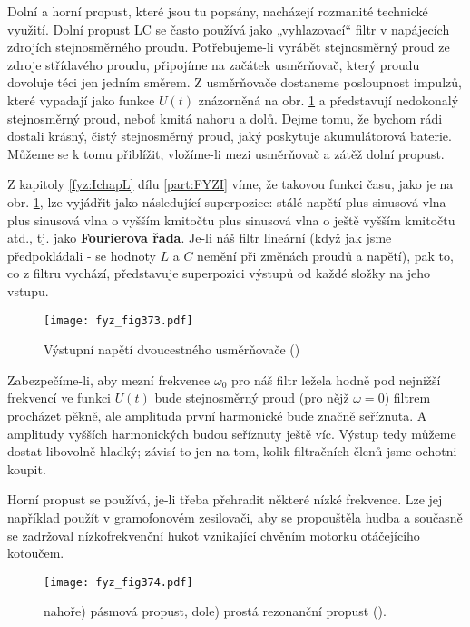   Dolní a horní propust, které jsou tu popsány, nacházejí rozmanité technické využití. Dolní 
  propust LC se často používá jako „vyhlazovací“ filtr v napájecích zdrojích stejnosměrného proudu. 
  Potřebujeme-li vyrábět stejnosměrný proud ze zdroje střídavého proudu, připojíme na začátek 
  usměrňovač, který proudu dovoluje téci jen jedním směrem. Z usměrňovače dostaneme posloupnost 
  impulzů, které vypadají jako funkce \(U(t)\) znázorněná na obr. \ref{fyz:fig373} a představují 
  nedokonalý stejnosměrný proud, neboť kmitá nahoru a dolů. Dejme tomu, že bychom rádi dostali 
  krásný, čistý stejnosměrný proud, jaký poskytuje akumulátorová baterie. Můžeme se k tomu 
  přiblížit, vložíme-li mezi usměrňovač a zátěž dolní propust. 
  
  Z kapitoly \ref{fyz:IchapL} dílu \ref{part:FYZI} víme, že takovou funkci času, jako je na obr. 
  \ref{fyz:fig373}, lze vyjádřit jako následující superpozice: stálé napětí plus sinusová vlna plus 
  sinusová vlna o vyšším kmitočtu plus sinusová vlna o ještě vyšším kmitočtu atd., tj. jako 
  \textbf{Fourierova řada}. Je-li náš filtr lineární (když jak jsme předpokládali - se hodnoty 
  \(L\) a \(C\) nemění při změnách proudů a napětí), pak to, co z filtru vychází, představuje 
  superpozici výstupů od každé složky na jeho vstupu.
  
  \begin{figure}[ht!] %
    \centering
    \texttt{[image: fyz\_fig373.pdf]}
    \caption{Výstupní napětí dvoucestného usměrňovače
             (\cite[s.~412]{Feynman02})}
    \label{fyz:fig373}
  \end{figure}
  
  Zabezpečíme-li, aby mezní frekvence \(\omega_0\) pro náš filtr ležela hodně pod nejnižší 
  frekvencí ve funkci \(U(t)\) bude stejnosměrný proud (pro nějž \(\omega = 0\)) filtrem procházet 
  pěkně, ale amplituda první harmonické bude značně seříznuta. A amplitudy vyšších harmonických 
  budou seříznuty ještě víc. Výstup tedy můžeme dostat libovolně hladký; závisí to jen na tom, 
  kolik filtračních členů jsme ochotni koupit.
  
  Horní propust se používá, je-li třeba přehradit některé nízké frekvence. Lze jej například použít 
  v gramofonovém zesilovači, aby se propouštěla hudba a současně se zadržoval nízkofrekvenční hukot 
  vznikající chvěním motorku otáčejícího kotoučem.
  
  \begin{figure}[ht!] %
    \centering
    \texttt{[image: fyz\_fig374.pdf]}
    \caption{nahoře) pásmová propust, dole) prostá rezonanční propust
             (\cite[s.~412]{Feynman02}).}
    \label{fyz:fig374}
  \end{figure}
  
